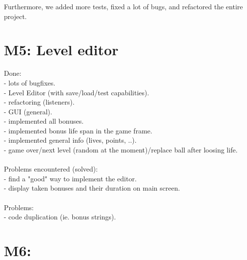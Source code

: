 Furthermore, we added more tests, fixed a lot of bugs, and refactored the entire project.\\

\section*{M5: Level editor}
\label{sec:m5}
Done:\\
- lots of bugfixes.\\
- Level Editor (with save/load/test capabilities).\\
- refactoring (listeners).\\
- GUI (general).\\
- implemented all bonuses.\\
- implemented bonus life span in the game frame.\\
- implemented general info (lives, points, ..).\\
- game over/next level (random at the moment)/replace ball after loosing life.\\
\\
Problems encountered (solved): \\
- find a "good" way to implement the editor.\\
- display taken bonuses and their duration on main screen.\\
\\
Problems: \\
- code duplication (ie. bonus strings).\\

\section*{M6: }
\label{sec:m6}
